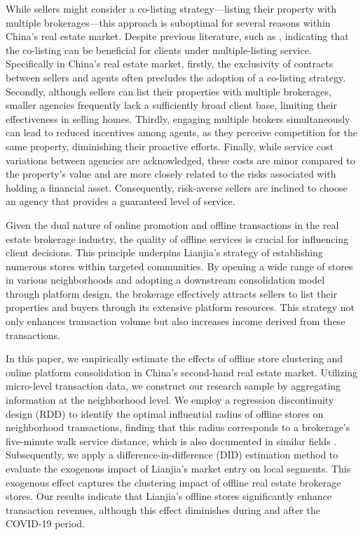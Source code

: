 \documentclass[11pt]{article}
\begin{document}
While sellers might consider a co-listing strategy—listing their property with multiple brokerages—this approach is suboptimal for several reasons within China's real estate market. Despite previous literature, such as \citep{RePEc:kap:jrefec:v:67:y:2023:i:3:d:10.1007_s11146-021-09858-w}, indicating that the co-listing can be beneficial for clients under multiple-listing service. Specifically in China's real estate market, firstly, the exclusivity of contracts between sellers and agents often precludes the adoption of a co-listing strategy. Secondly, although sellers can list their properties with multiple brokerages, smaller agencies frequently lack a sufficiently broad client base, limiting their effectiveness in selling homes. Thirdly, engaging multiple brokers simultaneously can lead to reduced incentives among agents, as they perceive competition for the same property, diminishing their proactive efforts. Finally, while service cost variations between agencies are acknowledged, these costs are minor compared to the property's value and are more closely related to the risks associated with holding a financial asset. Consequently, risk-averse sellers are inclined to choose an agency that provides a guaranteed level of service. 

Given the dual nature of online promotion and offline transactions in the real estate brokerage industry, the quality of offline services is crucial for influencing client decisions. This principle underpins Lianjia's strategy of establishing numerous stores within targeted communities. By opening a wide range of stores in various neighborhoods and adopting a downstream consolidation model through platform design, the brokerage effectively attracts sellers to list their properties and buyers through its extensive platform resources. This strategy not only enhances transaction volume but also increases income derived from these transactions.

In this paper, we empirically estimate the effects of offline store clustering and online platform consolidation in China's second-hand real estate market. Utilizing micro-level transaction data, we construct our research sample by aggregating information at the neighborhood level. We employ a regression discontinuity design (RDD) to identify the optimal influential radius of offline stores on neighborhood transactions, finding that this radius corresponds to a brokerage's five-minute walk service distance, which is also documented in similar fields \citep{AZMI2012406}. Subsequently, we apply a difference-in-difference (DID) estimation method to evaluate the exogenous impact of Lianjia's market entry on local segments. This exogenous effect captures the clustering impact of offline real estate brokerage stores. Our results indicate that Lianjia's offline stores significantly enhance transaction revenues, although this effect diminishes during and after the COVID-19 period.
\end{document}
